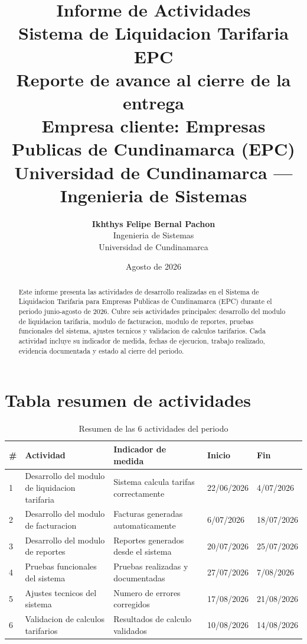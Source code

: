 \documentclass[11pt,a4paper,oneside]{report}
\title{
    \vspace{-2cm}
    \Huge \textbf{Informe de Actividades} \\[0.5cm]
    \LARGE \textbf{Sistema de Liquidacion Tarifaria EPC} \\[1cm]
    \normalsize Reporte de avance al cierre de la entrega \\[0.3cm]
    \normalsize Empresa cliente: Empresas Publicas de Cundinamarca (EPC) \\[0.3cm]
    \normalsize Universidad de Cundinamarca --- Ingenieria de Sistemas
}
\author{
    \Large \textbf{Ikhthys Felipe Bernal Pachon} \\[0.5cm]
    \normalsize Ingenieria de Sistemas \\
    \normalsize Universidad de Cundinamarca
}
\date{Agosto de 2026}
\begin{document}
\maketitle

\thispagestyle{empty}


\begin{abstract}
\noindent
Este informe presenta las actividades de desarrollo realizadas en el Sistema de Liquidacion Tarifaria para Empresas Publicas de Cundinamarca (EPC) durante el periodo junio-agosto de 2026. Cubre seis actividades principales: desarrollo del modulo de liquidacion tarifaria, modulo de facturacion, modulo de reportes, pruebas funcionales del sistema, ajustes tecnicos y validacion de calculos tarifarios. Cada actividad incluye su indicador de medida, fechas de ejecucion, trabajo realizado, evidencia documentada y estado al cierre del periodo.
\end{abstract}

\tableofcontents
\listoftables

\newpage


\chapter{Tabla resumen de actividades}

\begin{table}[h]
\centering
\caption{Resumen de las 6 actividades del periodo}
\begin{tabularx}{\textwidth}{L{1.5cm} L{5cm} L{5cm} L{2cm} L{2cm}}
\toprule
\textbf{\#} & \textbf{Actividad} & \textbf{Indicador de medida} & \textbf{Inicio} & \textbf{Fin} \\
 & Desarrollo del modulo de liquidacion tarifaria & Sistema calcula tarifas correctamente & 22/06/2026 & 4/07/2026 \\
2 & Desarrollo del modulo de facturacion & Facturas generadas automaticamente & 6/07/2026 & 18/07/2026 \\
3 & Desarrollo del modulo de reportes & Reportes generados desde el sistema & 20/07/2026 & 25/07/2026 \\
4 & Pruebas funcionales del sistema & Pruebas realizadas y documentadas & 27/07/2026 & 7/08/2026 \\
5 & Ajustes tecnicos del sistema & Numero de errores corregidos & 17/08/2026 & 21/08/2026 \\
6 & Validacion de calculos tarifarios & Resultados de calculo validados & 10/08/2026 & 14/08/2026 \\
\bottomrule
\end{tabularx}
\end{table}
\end{document}

